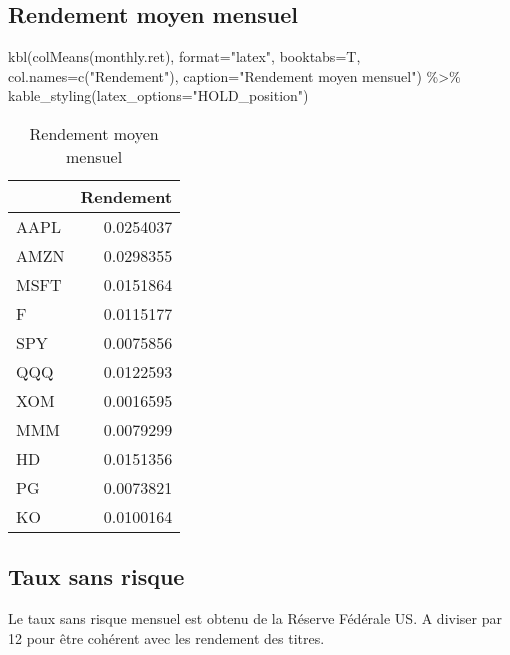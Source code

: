 \documentclass[
]{article}
\newenvironment{Shaded}{\begin{snugshade}}{\end{snugshade}}
\newcommand{\AttributeTok}[1]{\textcolor[rgb]{0.77,0.63,0.00}{#1}}
\newcommand{\FunctionTok}[1]{\textcolor[rgb]{0.00,0.00,0.00}{#1}}
\newcommand{\NormalTok}[1]{#1}
\newcommand{\SpecialCharTok}[1]{\textcolor[rgb]{0.00,0.00,0.00}{#1}}
\newcommand{\StringTok}[1]{\textcolor[rgb]{0.31,0.60,0.02}{#1}}
\begin{document}
\hypertarget{rendement-moyen-mensuel}{%
\subsection{Rendement moyen mensuel}\label{rendement-moyen-mensuel}}

\begin{Shaded}
\begin{Highlighting}[]
\FunctionTok{kbl}\NormalTok{(}\FunctionTok{colMeans}\NormalTok{(monthly.ret), }\AttributeTok{format=}\StringTok{"latex"}\NormalTok{, }\AttributeTok{booktabs=}\NormalTok{T, }
    \AttributeTok{col.names=}\FunctionTok{c}\NormalTok{(}\StringTok{"Rendement"}\NormalTok{), }\AttributeTok{caption=}\StringTok{"Rendement moyen mensuel"}\NormalTok{) }\SpecialCharTok{\%\textgreater{}\%}
    \FunctionTok{kable\_styling}\NormalTok{(}\AttributeTok{latex\_options=}\StringTok{"HOLD\_position"}\NormalTok{)}
\end{Highlighting}
\end{Shaded}

\begin{table}[H]

\caption{\label{tab:unnamed-chunk-3}Rendement moyen mensuel}
\centering
\begin{tabular}[t]{lr}
\toprule
  & Rendement\\
\midrule
AAPL & 0.0254037\\
AMZN & 0.0298355\\
MSFT & 0.0151864\\
F & 0.0115177\\
SPY & 0.0075856\\
\addlinespace
QQQ & 0.0122593\\
XOM & 0.0016595\\
MMM & 0.0079299\\
HD & 0.0151356\\
PG & 0.0073821\\
\addlinespace
KO & 0.0100164\\
\bottomrule
\end{tabular}
\end{table}

\hypertarget{taux-sans-risque}{%
\subsection{Taux sans risque}\label{taux-sans-risque}}

Le taux sans risque mensuel est obtenu de la Réserve Fédérale US. A
diviser par 12 pour être cohérent avec les rendement des titres.
\end{document}

